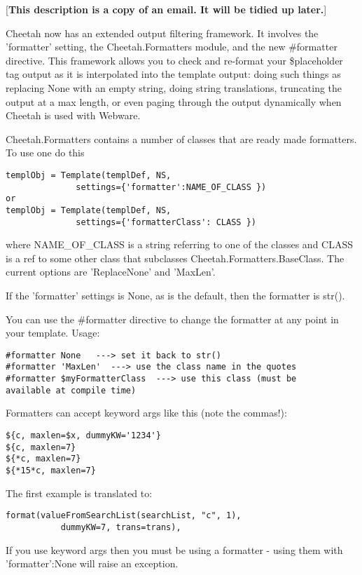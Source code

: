 [{\bf This description is a copy of an email.  It will be tidied up later.}]

Cheetah now has an extended output filtering framework. It involves the
'formatter' setting, the Cheetah.Formatters module, and the new #formatter
directive.  This framework allows you to check and re-format your \$placeholder
tag output as it is interpolated into the template output: doing such things as
replacing None with an empty string, doing string translations, truncating the
output at a max length, or even paging through the output dynamically when
Cheetah is used with Webware.

Cheetah.Formatters contains a number of classes that are ready made formatters.
To use one do this
\begin{verbatim}
templObj = Template(templDef, NS, 
              settings={'formatter':NAME_OF_CLASS })
or 
templObj = Template(templDef, NS, 
              settings={'formatterClass': CLASS })

\end{verbatim}

where NAME_OF_CLASS is a string referring to one of the classes and CLASS is a
ref to some other class that subclasses Cheetah.Formatters.BaseClass. The
current options are 'ReplaceNone' and 'MaxLen'.

If the 'formatter' settings is None, as is the default, then the formatter is
str().

You can use the \#formatter directive to change the 
formatter at any point in your template.  Usage:

\begin{verbatim}
#formatter None   ---> set it back to str()
#formatter 'MaxLen'  ---> use the class name in the quotes
#formatter $myFormatterClass  ---> use this class (must be 
available at compile time)
\end{verbatim}

Formatters can accept keyword args like this (note the commas!):
\begin{verbatim}
${c, maxlen=$x, dummyKW='1234'}
${c, maxlen=7}
${*c, maxlen=7}
${*15*c, maxlen=7}
\end{verbatim}

The first example is translated to: 
\begin{verbatim}
format(valueFromSearchList(searchList, "c", 1), 
           dummyKW=7, trans=trans),
\end{verbatim}

If you use keyword args then you must be using a formatter - using them with
'formatter':None will raise an exception.

